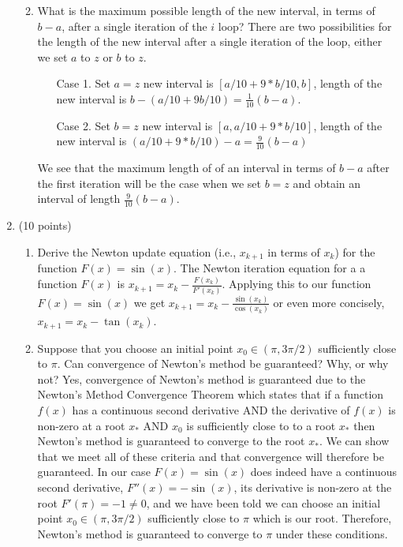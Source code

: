\documentclass{article}
\begin{document}
\begin{enumerate}
\begin{enumerate}
        \newpage
        \item What is the maximum possible length of the new interval, in terms of $b - a$, after a single iteration of the $i$ loop?
        \newline
        \newline
        There are two possibilities for the length of the new interval after a single iteration of the loop, either we set $a$ to $z$ or $b$ to $z$.
        \begin{enumerate}
            \item[Case 1.] Set $a = z$ new interval is $[a/10 + 9*b/10, b]$, length of the new interval is $b - (a/10 + 9b/10) = \frac{1}{10}(b - a)$.
            \item[Case 2.] Set $b = z$ new interval is $[a, a/10 + 9*b/10]$, length of the new interval is $(a/10 + 9*b/10) - a = \frac{9}{10}(b - a)$
        \end{enumerate}
        We see that the maximum length of of an interval in terms of $b-a$ after the first iteration will be the case when we set $b = z$ and obtain an interval of length $\frac{9}{10}(b - a)$.
    \end{enumerate}
    \item (10 points)
    \begin{enumerate}
        \item Derive the Newton update equation (i.e., $x_{k+1}$ in terms of $x_k$) for the function $F(x) = \sin(x)$.
        \newline
        \newline
        The Newton iteration equation for a a function $F(x)$ is $x_{k+1} = x_k - \frac{F(x_k)}{F'(x_k)}$. Applying this to our function $F(x) = \sin(x)$ we get $x_{k+1} = x_k - \frac{\sin(x_k)}{\cos(x_k)}$ or even more concisely, $x_{k+1} = x_k - \tan(x_k)$. 
        \item Suppose that you choose an initial point $x_0\in (\pi, 3\pi/2)$ sufficiently close to $\pi$. Can convergence of Newton’s method be guaranteed? Why, or why not?
        \newline
        \newline
        Yes, convergence of Newton's method is guaranteed due to the Newton's Method Convergence Theorem which states that if a function $f(x)$ has a continuous second derivative AND the derivative of $f(x)$ is non-zero at a root $x_*$ AND $x_0$ is sufficiently close to to a root $x_*$ then Newton's method is guaranteed to converge to the root $x_*$. We can show that we meet all of these criteria and that convergence will therefore be guaranteed. In our case $F(x) = \sin(x)$ does indeed have a continuous second derivative, $F''(x) = -\sin(x)$, its derivative is non-zero at the root $F'(\pi) = -1 \neq 0$, and we have been told we can choose an initial point $x_0\in (\pi, 3\pi/2)$ sufficiently close to $\pi$ which is our root. Therefore, Newton's method is guaranteed to converge to $\pi$ under these conditions. 

\end{enumerate}
\end{enumerate}
\end{document}
